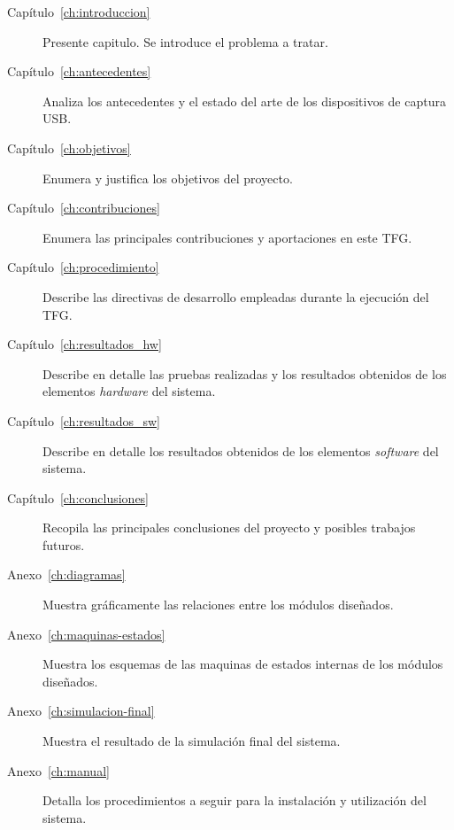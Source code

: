 \begin{description}
    \item[Capítulo~\ref{ch:introduccion}]
    Presente capitulo. Se introduce el problema a tratar.
    
    \item[Capítulo~\ref{ch:antecedentes}]
    Analiza los antecedentes y el estado del arte de los dispositivos de captura USB.
    
    \item[Capítulo~\ref{ch:objetivos}]
    Enumera y justifica los objetivos del proyecto.
    
    \item[Capítulo~\ref{ch:contribuciones}]
    Enumera las principales contribuciones y aportaciones en este TFG.
    
    \item[Capítulo~\ref{ch:procedimiento}]
    Describe las directivas de desarrollo empleadas durante la ejecución del TFG.
    
    \item[Capítulo~\ref{ch:resultados_hw}]
    Describe en detalle las pruebas realizadas y los resultados obtenidos de los elementos \emph{hardware} del sistema.
    
    \item[Capítulo~\ref{ch:resultados_sw}]
    Describe en detalle los resultados obtenidos de los elementos \emph{software} del sistema.
    
    \item[Capítulo~\ref{ch:conclusiones}]
    Recopila las principales conclusiones del proyecto y posibles trabajos futuros.
    
    \item[Anexo~\ref{ch:diagramas}]
    Muestra gráficamente las relaciones entre los módulos diseñados.
    
    \item[Anexo~\ref{ch:maquinas-estados}]
    Muestra los esquemas de las maquinas de estados internas de los módulos diseñados.
    
    \item[Anexo~\ref{ch:simulacion-final}]
    Muestra el resultado de la simulación final del sistema.
    
    \item[Anexo~\ref{ch:manual}]
    Detalla los procedimientos a seguir para la instalación y utilización del sistema.
\end{description}



